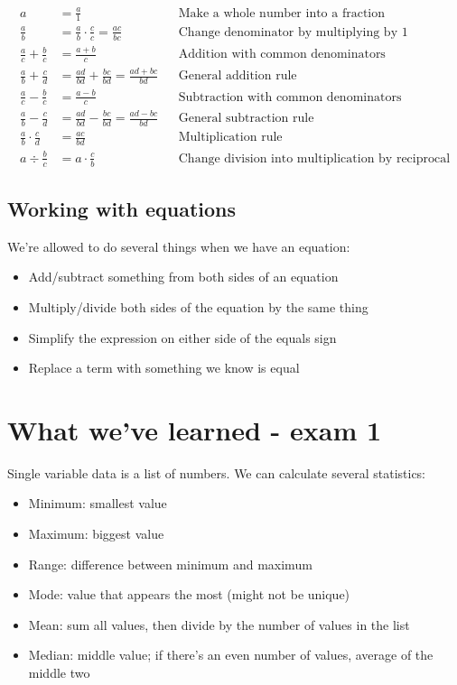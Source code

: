 \documentclass{article}
\begin{document}
\begin{align*}
    a&=\frac{a}{1} && \text{Make a whole number into a fraction}\\
    \frac{a}{b}&=\frac{a}{b}\cdot\frac{c}{c}=\frac{ac}{bc}&&\text{Change denominator by multiplying by 1}\\
    \frac{a}{c}+\frac{b}{c}&=\frac{a+b}{c} && \text{Addition with common denominators}\\
    \frac{a}{b}+\frac{c}{d}&=\frac{ad}{bd}+\frac{bc}{bd}=\frac{ad+bc}{bd} && \text{General addition rule}\\
    \frac{a}{c}-\frac{b}{c}&=\frac{a-b}{c} && \text{Subtraction with common denominators}\\
    \frac{a}{b}-\frac{c}{d}&=\frac{ad}{bd}-\frac{bc}{bd}=\frac{ad-bc}{bd} && \text{General subtraction rule}\\
    \frac{a}{b}\cdot\frac{c}{d}&=\frac{ac}{bd} && \text{Multiplication rule}\\
    a\div\frac{b}{c}&=a\cdot\frac{c}{b} && \text{Change division into multiplication by reciprocal}
\end{align*}



\subsection*{Working with equations}

We're allowed to do several things when we have an equation:
\begin{itemize}
    \item Add/subtract something from both sides of an equation
    \item Multiply/divide both sides of the equation by the same thing
    \item Simplify the expression on either side of the equals sign
    \item Replace a term with something we know is equal
\end{itemize}

\section*{What we've learned - exam 1}

Single variable data is a list of numbers. We can calculate several statistics:
\begin{itemize}
    \item Minimum: smallest value
    \item Maximum: biggest value
    \item Range: difference between minimum and maximum
    \item Mode: value that appears the most (might not be unique)
    \item Mean: sum all values, then divide by the number of values in the list
    \item Median: middle value; if there's an even number of values, average of the middle two
\end{itemize}
\end{document}
